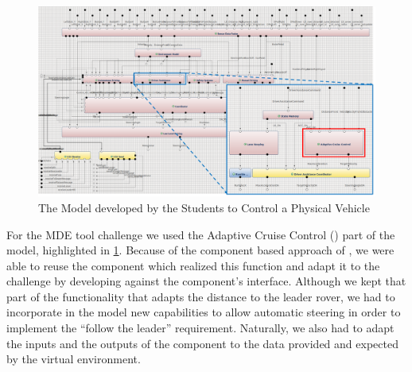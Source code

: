 \begin{figure}[!h]
\centering
\includegraphics[width=1.4\textwidth, angle=90]{images/ACC_architecture}
\caption{The \af Model developed by the Students to Control a Physical Vehicle}
\label{fig:vehicle_architecture}
\end{figure}

For the MDE tool challenge we used the Adaptive Cruise Control (\acc) part of
the model, highlighted in  \fig\ref{fig:vehicle_architecture}. Because of the
component based approach of \af, we were able to reuse the component which
realized this function and adapt it to the challenge by developing against the
component's interface. Although we kept that part of the functionality that
adapts the distance to the leader rover, we had to incorporate in the model new
capabilities to allow automatic steering in order to implement the ``follow the
leader'' requirement. Naturally, we also had to adapt the inputs and the outputs of the
component to the data provided and expected by the virtual environment.
